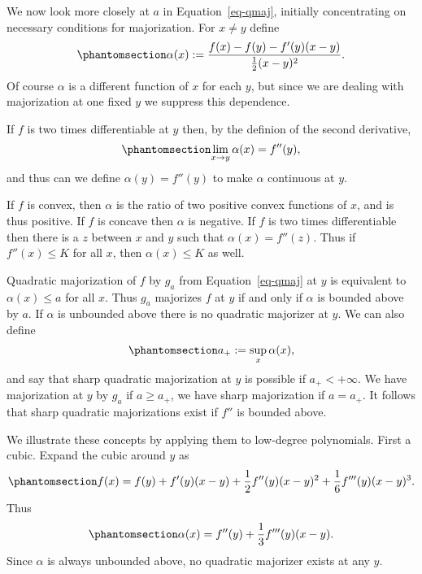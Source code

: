 \documentclass[
  12pt,
  letterpaper,
  DIV=11,
  numbers=noendperiod]{scrartcl}
\theoremstyle{definition}
\theoremstyle{plain}
\theoremstyle{plain}
\theoremstyle{plain}
\theoremstyle{definition}
\theoremstyle{remark}
\begin{document}
We now look more closely at \(a\) in Equation~\ref{eq-qmaj}, initially
concentrating on necessary conditions for majorization. For
\(x\not = y\) define \begin{equation}\phantomsection\label{eq-alpdef}{
\alpha(x):=\frac{f(x)-f(y)-f'(y)(x-y)}{\frac12(x-y)^2}.
}\end{equation} Of course \(\alpha\) is a different function of \(x\)
for each \(y\), but since we are dealing with majorization at one fixed
\(y\) we suppress this dependence.

If \(f\) is two times differentiable at \(y\) then, by the definion of
the second derivative, \begin{equation}\phantomsection\label{eq-alphop}{
\lim_{x\rightarrow y}\alpha(x)=f''(y),
}\end{equation} and thus can we define \(\alpha(y)=f''(y)\) to make
\(\alpha\) continuous at \(y\).

If \(f\) is convex, then \(\alpha\) is the ratio of two positive convex
functions of \(x\), and is thus positive. If \(f\) is concave then
\(\alpha\) is negative. If \(f\) is two times differentiable then there
is a \(z\) between \(x\) and \(y\) such that \(\alpha(x)=f''(z)\). Thus
if \(f''(x)\leq K\) for all \(x\), then \(\alpha(x)\leq K\) as well.

Quadratic majorization of \(f\) by \(g_a\) from Equation~\ref{eq-qmaj}
at \(y\) is equivalent to \(\alpha(x)\leq a\) for all \(x\). Thus
\(g_a\) majorizes \(f\) at \(y\) if and only if \(\alpha\) is bounded
above by \(a\). If \(\alpha\) is unbounded above there is no quadratic
majorizer at \(y\). We can also define
\begin{equation}\phantomsection\label{eq-aplus}{ 
a_+:=\sup_x\alpha(x),
}\end{equation} and say that sharp quadratic majorization at \(y\) is
possible if \(a_+<+\infty\). We have majorization at \(y\) by \(g_a\) if
\(a\geq a_+\), we have sharp majorization if \(a=a_+\). It follows that
sharp quadratic majorizations exist if \(f''\) is bounded above.

We illustrate these concepts by applying them to low-degree polynomials.
First a cubic. Expand the cubic around \(y\) as
\begin{equation}\phantomsection\label{eq-cubexp}{
f(x)=f(y)+f'(y)(x-y)+\frac12f''(y)(x-y)^2+\frac16f'''(y)(x-y)^3.
}\end{equation} Thus \begin{equation}\phantomsection\label{eq-cubalp}{
\alpha(x)=f''(y)+\frac13f'''(y)(x-y).
}\end{equation} Since \(\alpha\) is always unbounded above, no quadratic
majorizer exists at any \(y\).
\end{document}
